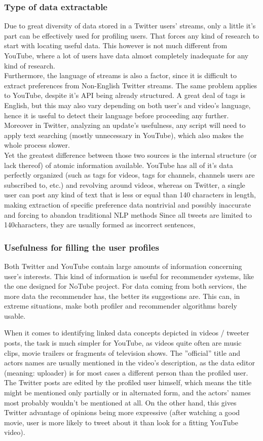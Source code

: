 \subsubsection{Type of data extractable}
Due to great diversity of data stored in a Twitter users' streams, only a little it's part can be effectively used for profiling
users. That forces any kind of research to start with locating useful data. This however is not much different from YouTube, where
a lot of users have data almost completely inadequate for any kind of research.
\\ Furthermore, the language of streams is also a factor, since it is difficult to extract preferences from Non-English Twitter
streams. The same problem applies to YouTube, despite it's API being already structured. A great deal of tags is English,
but this may also vary depending on both user's and video's language, hence it is useful to detect their language before
proceeding any further. Moreover in Twitter, analyzing an update's usefulness, any script will need to apply text searching (mostly
unnecessary in YouTube), which also makes the whole process slower.
\\ Yet the greatest difference between those two sources is the internal structure (or lack thereof) of atomic information
available. YouTube has all of it's data perfectly organized (such as tags for videos, tags for channels, channels users are
subscribed to, etc.) and revolving around videos, whereas on Twitter, a single user can post any kind of text that is
less or equal than 140 characters in length, making extraction of specific preference data nontrivial and possibly inaccurate and forcing to abandon traditional
NLP methods
Since all tweets are limited to 140characters, they are usually formed as incorrect sentences,

\subsubsection{Usefulness for filling the user profiles}
Both Twitter and YouTube contain large amounts of information concerning user's
interests. This kind of information is useful for recommender
systems, like the one designed for NoTube project.
For data coming from both services, the more data the recommender has, the
better its suggestions are. This can, in extreme situations, make both profiler and recommender
algorithms barely usable.

When it comes to identifying linked data concepts depicted in videos / tweeter
posts, the task is much simpler for YouTube, as videos quite often are music
clips, movie trailers or fragments of television shows. The ''official'' title
and actors names are usually mentioned in the video's description, as the data
editor (meaning: uploader) is for most cases a different person than the
profiled user. The Twitter posts are edited by the profiled user himself, which
means the title might be mentioned only partially or in alternated form, and
the actors' names most probably wouldn't be mentioned at all.
On the other hand, this gives Twitter advantage of opinions being more
expressive (after watching a good movie, user is more likely to tweet about it
than look for a fitting YouTube video).


